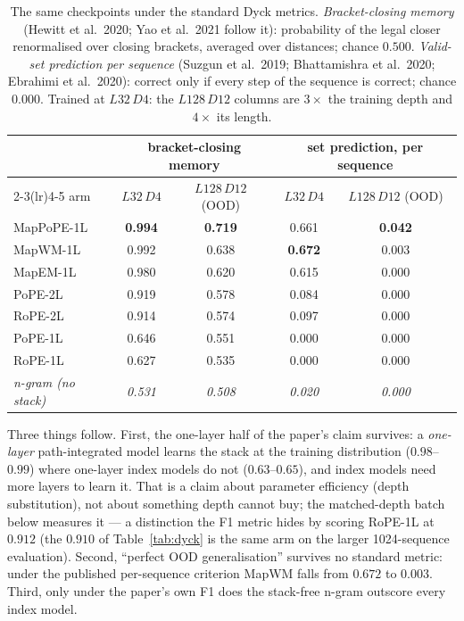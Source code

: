 \documentclass[10pt]{article}
\begin{document}
\begin{table}[h]\centering\footnotesize
\caption{The same checkpoints under the standard Dyck metrics. \emph{Bracket-closing memory}
(Hewitt et al.\ 2020; Yao et al.\ 2021 follow it): probability of the legal closer renormalised over
closing brackets, averaged over distances; chance $0.500$. \emph{Valid-set prediction per sequence}
(Suzgun et al.\ 2019; Bhattamishra et al.\ 2020; Ebrahimi et al.\ 2020): correct only if every step of the
sequence is correct; chance $0.000$. Trained at $L32\,D4$: the $L128\,D12$ columns are $3\times$ the training depth and $4\times$ its length.}
\begin{tabular}{lcc cc}
\toprule
& \multicolumn{2}{c}{bracket-closing memory} & \multicolumn{2}{c}{set prediction, per sequence} \\
\cmidrule(lr){2-3}\cmidrule(lr){4-5}
arm & $L32\,D4$ & $L128\,D12$ (OOD) & $L32\,D4$ & $L128\,D12$ (OOD) \\
\midrule
MapPoPE-1L & \textbf{0.994} & \textbf{0.719} & 0.661 & \textbf{0.042} \\
MapWM-1L & 0.992 & 0.638 & \textbf{0.672} & 0.003 \\
MapEM-1L & 0.980 & 0.620 & 0.615 & 0.000 \\
PoPE-2L & 0.919 & 0.578 & 0.084 & 0.000 \\
RoPE-2L & 0.914 & 0.574 & 0.097 & 0.000 \\
PoPE-1L & 0.646 & 0.551 & 0.000 & 0.000 \\
RoPE-1L & 0.627 & 0.535 & 0.000 & 0.000 \\
\emph{n-gram (no stack)} & \emph{0.531} & \emph{0.508} & \emph{0.020} & \emph{0.000} \\
\bottomrule
\end{tabular}
\label{tab:dyck-std}
\end{table}

Three things follow. First, the one-layer half of the paper's claim survives: a \emph{one-layer} path-integrated
model learns the stack at the training distribution ($0.98$--$0.99$) where one-layer index models do not
($0.63$--$0.65$), and index models need more layers to learn it. That is a claim about parameter efficiency
(depth substitution), not about something depth cannot buy; the matched-depth batch below measures it
--- a distinction the F1 metric hides by scoring RoPE-1L at $0.912$ (the $0.910$ of Table~\ref{tab:dyck} is the same arm on the larger 1024-sequence evaluation). Second, ``perfect OOD generalisation''
survives no standard metric: under the published per-sequence criterion MapWM falls from $0.672$ to $0.003$.
Third, only under the paper's own F1 does the stack-free n-gram outscore every index model.
\end{document}
